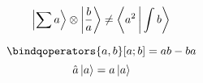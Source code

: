 \documentclass{minimal}
\newcommand{\commutr}[2]{[#1;#2]}
\begin{document}
\[
  \left\lvert \sum a \right\rangle \mathbin{\otimes} \left\lvert \frac b a \right\rangle \neq \left\langle a^2 \,\middle\vert\, \int b\right\rangle
\]

\[\bindqoperators{a,b}
  \commutr ab = ab - ba
\]
\def \lowerhat#1{\lowercase{\hat #1}}
\[\declareMathLetterTransform A{\lowerhat} %
  A \ket {a} = a \ket a
\]
\end{document}
